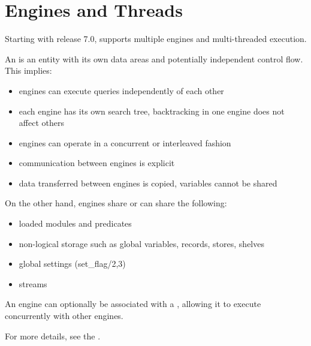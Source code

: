 %
%
%

\chapter{Engines and Threads}

Starting with release 7.0, \eclipse{} supports multiple engines and
multi-threaded execution.

An  is an entity with its own data areas and
potentially independent control flow.  This implies:
\begin{itemize}
\item engines can execute queries independently of each other
\item each engine has its own search tree, backtracking in one engine does not affect others
\item engines can operate in a concurrent or interleaved fashion
\item communication between engines is explicit
\item data transferred between engines is copied, variables cannot be shared
\end{itemize}
On the other hand, engines share or can share the following:
\begin{itemize}
\item loaded modules and predicates
\item non-logical storage such as global variables, records, stores, shelves
\item global settings (set_flag/2,3)
\item streams
\end{itemize}

An engine can optionally be associated with a ,
allowing it to execute concurrently with other engines.

For more details, see the 
.


